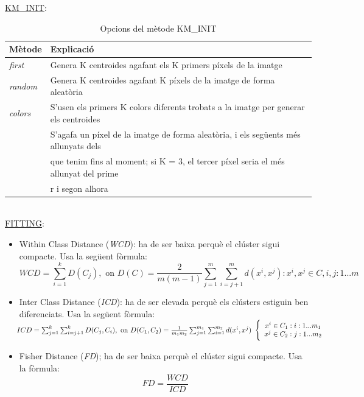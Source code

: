\documentclass[a4paper, 11pt]{article}
\begin{document}
\underline{KM\_INIT}:
\begin{table}[h]
    \centering
    \begin{tabular}{ l | l }
        \textbf{Mètode} & \textbf{Explicació} \\ \hline\hline
        \textit{first} & Genera K centroides agafant els K primers píxels de la imatge \\ \hdashline
        \textit{random} & Genera K centroides agafant K píxels de la imatge de forma aleatòria \\ \hdashline
        \textit{colors} & S'usen els primers K colors diferents trobats a la imatge per generar els centroides \\ \hdashline
        \multirow{3}{*}{\textit{distance}} & S'agafa un píxel de la imatge de forma aleatòria, i els següents més allunyats dels \\
        & que tenim fins al moment; si K = 3, el tercer píxel seria el més allunyat del prime\\
        & r i segon alhora
    \end{tabular}
    \caption{Opcions del mètode KM\_INIT}
    \label{tab:my_label}
\end{table}\\
\underline{FITTING}:
\begin{itemize}
    \item Within Class Distance (\textit{WCD}): ha de ser baixa perquè el clúster sigui compacte. Usa la següent fòrmula:
    $$WCD = \sum_{i=1}^{k}  D(C_{j}), \text{ on } D(C) = \frac{2}{m(m-1)} \sum_{j=1}^{m}\sum_{i=j+1}^{m} d(x^i,x^j) : x^i, x^j \in C, i, j: 1...m$$
    \item Inter Class Distance (\textit{ICD}): ha de ser elevada perquè els clústers estiguin ben diferenciats. Usa la següent fòrmula:\\
$\begin{array}{ccc}
    \hspace{-1em} ICD = \sum_{j=1}^{k} \sum_ {i=j+1}^k D(C_{j},C_{i}), \text{ on } D(C_1, C_2) = \frac{1}{m_1m_2} \sum_{j=1}^{m_1}\sum_{i=1}^{m_2} d(x^i,x^j)
\end{array}\Bigg\{ \begin{array}{cc}
    x^i\in C_1:i:1...m_1 \\
    x^j \in C_2:j:1...m_2
\end{array}$
    \item Fisher Distance (\textit{FD}); ha de ser baixa perquè el clúster sigui compacte. Usa la fòrmula: 
    $$FD = \frac{WCD}{ICD}$$
\end{itemize}\\
\end{document}
